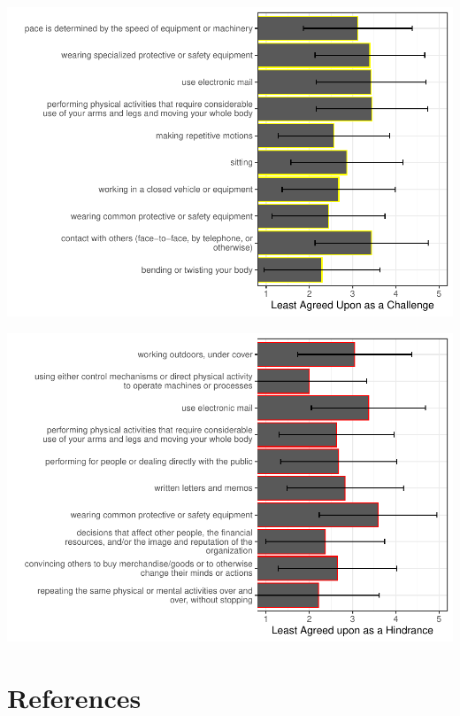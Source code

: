 \documentclass[
  english,
  man]{apa6}
\begin{document}
\includegraphics{Submission_files/figure-latex/challengeshighsd-1.pdf}

\includegraphics{Submission_files/figure-latex/hindranceshighsd-1.pdf}

\newpage

\hypertarget{references}{%
\section{References}\label{references}}

\begingroup
\setlength{\parindent}{-0.5in}
\setlength{\leftskip}{0.5in}
\end{document}

